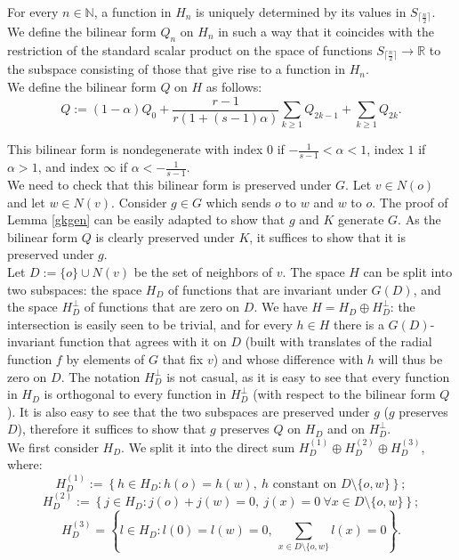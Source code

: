 \documentclass{article}
\theoremstyle{definition}
\theoremstyle{remark}
\theoremstyle{plain}
\begin{document}
For every $n\in\mathbb{N}$, a function in $H_n$ is uniquely determined by its values in $S_{\lceil\frac{n}{2}\rceil}$. We define the bilinear form $Q_n$ on $H_n$ in such a way that it coincides with the restriction of the standard scalar product on the space of functions $S_{\lceil\frac{n}{2}\rceil}\rightarrow\mathbb{R}$ to the subspace consisting of those that give rise to a function in $H_n$. \\

We define the bilinear form $Q$ on $H$ as follows: $$Q:=(1-\alpha)Q_0+\frac{r-1}{r(1+(s-1)\alpha)}\sum_{k\geq 1}{Q_{2k-1}}+\sum_{k\geq 1}{Q_{2k}}.$$

This bilinear form is nondegenerate with index $0$ if $-\frac{1}{s-1}<\alpha<1$, index $1$ if $\alpha>1$, and index $\infty$ if $\alpha<-\frac{1}{s-1}$. \\

We need to check that this bilinear form is preserved under $G$. Let $v\in N(o)$ and let $w\in N(v)$. Consider $g\in G$ which sends $o$ to $w$ and $w$ to $o$. The proof of Lemma \ref{gkgen} can be easily adapted to show that $g$ and $K$ generate $G$. As the bilinear form $Q$ is clearly preserved under $K$, it suffices to show that it is preserved under $g$. \\

Let $D:=\{o\}\cup N(v)$ be the set of neighbors of $v$. The space $H$ can be split into two subspaces: the space $H_D$ of functions that are invariant under $G(D)$, and the space $H_D^\perp$ of functions that are zero on $D$. We have $H=H_D\oplus H_D^\perp$: the intersection is easily seen to be trivial, and for every $h\in H$ there is a $G(D)$-invariant function that agrees with it on $D$ (built with translates of the radial function $f$ by elements of $G$ that fix $v$) and whose difference with $h$ will thus be zero on $D$. The notation $H_D^\perp$ is not casual, as it is easy to see that every function in $H_D$ is orthogonal to every function in $H_D^\perp$ (with respect to the bilinear form $Q$). It is also easy to see that the two subspaces are preserved under $g$ ($g$ preserves $D$), therefore it suffices to show that $g$ preserves $Q$ on $H_D$ and on $H_D^\perp$. \\

We first consider $H_D$. We split it into the direct sum $H_D^{(1)}\oplus H_D^{(2)}\oplus H_D^{(3)}$, where: $$H_D^{(1)}:=\left\{h\in H_D: h(o)=h(w),\ h\text{ constant on }D\setminus\{o,w\}\right\};$$ $$H_D^{(2)}:=\left\{j\in H_D: j(o)+j(w)=0,\ j(x)=0\ \forall x\in D\setminus\{o,w\}\right\};$$ $$H_D^{(3)}=\left\{l\in H_D: l(0)=l(w)=0,\ \sum_{x\in D\setminus\{o,w\}}{l(x)}=0\right\}.$$ \\
\end{document}
